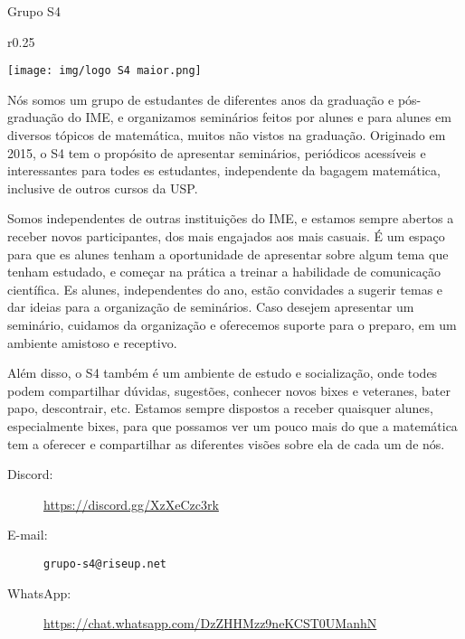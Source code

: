 \begin{subsecao}{Grupo S4}

\begin{wrapfigure}{r}{0.25\textwidth}
    \vspace{-25pt}
    \begin{center}
      \texttt{[image: img/logo S4 maior.png]}
    \end{center}
    \vspace{-25pt}
  \end{wrapfigure}


Nós somos um grupo de estudantes de diferentes anos da graduação e pós-graduação 
do IME, e organizamos seminários feitos por alunes e para alunes em diversos
tópicos de matemática, muitos não vistos na graduação. Originado em 2015, o S4 tem
o propósito de apresentar seminários, periódicos acessíveis e interessantes para todes 
es estudantes, independente da bagagem matemática, inclusive de outros cursos da USP. 

Somos independentes de outras instituições do IME, e estamos sempre abertos a 
receber novos participantes, dos mais engajados aos mais casuais. É um espaço
para que es alunes tenham a oportunidade de apresentar sobre algum tema que tenham
estudado, e começar na prática a treinar a habilidade de comunicação científica. 
Es alunes, independentes do ano, estão convidades a sugerir temas e dar ideias
para a organização de seminários. Caso desejem apresentar um seminário, cuidamos 
da organização e oferecemos suporte para o preparo, em um ambiente amistoso e receptivo.

Além disso, o S4 também é um ambiente de estudo e socialização, onde todes podem
compartilhar dúvidas, sugestões, conhecer novos bixes e veteranes, bater papo,
descontrair, etc. Estamos sempre dispostos a receber quaisquer alunes, especialmente
bixes, para que possamos ver um pouco mais do que a matemática tem a oferecer e
compartilhar as diferentes visões sobre ela de cada um de nós.

\begin{description}
  \item[Discord:] \url{https://discord.gg/XzXeCzc3rk}
  \item[E-mail:] {\tt grupo-s4@riseup.net}
  \item[WhatsApp:] \url{https://chat.whatsapp.com/DzZHHMzz9neKCST0UManhN}
\end{description}

\end{subsecao}
